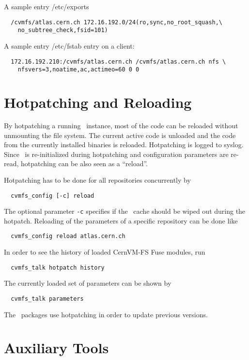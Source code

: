 A sample entry /etc/exports
\begin{verbatim}
  /cvmfs/atlas.cern.ch 172.16.192.0/24(ro,sync,no_root_squash,\
    no_subtree_check,fsid=101)
\end{verbatim}
A sample entry /etc/fstab entry on a client:
\begin{verbatim}
  172.16.192.210:/cvmfs/atlas.cern.ch /cvmfs/atlas.cern.ch nfs \
    nfsvers=3,noatime,ac,actimeo=60 0 0
\end{verbatim}


\section{Hotpatching and Reloading}
\label{sct:hotpatch}

By hotpatching a running \cvmfs\ instance, most of the code can be reloaded without unmounting the file system.
The current active code is unloaded and the code from the currently installed binaries is reloaded.
Hotpatching is logged to syslog.
Since \cvmfs\ is re-initialized during hotpatching and configuration parameters are re-read, hotpatching can be also seen as a ``reload''.

Hotpatching has to be done for all repositories concurrently by
\begin{verbatim}
  cvmfs_config [-c] reload
\end{verbatim}
The optional parameter \texttt{-c} specifies if the \cvmfs\ cache should be wiped out during the hotpatch.
Reloading of the parameters of a specific repository can be done like
\begin{verbatim}
  cvmfs_config reload atlas.cern.ch
\end{verbatim}
In order to see the history of loaded CernVM-FS Fuse modules, run
\begin{verbatim}
  cvmfs_talk hotpatch history
\end{verbatim}
The currently loaded set of parameters can be shown by
\begin{verbatim}
  cvmfs_talk parameters
\end{verbatim}
The \cvmfs\ packages use hotpatching in order to update previous versions.


\section{Auxiliary Tools}
\label{sct:tools}

